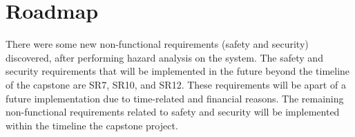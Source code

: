 \documentclass{article}
\begin{document}
\section{Roadmap}

There were some new non-functional requirements (safety and security) discovered, 
after performing hazard analysis on the system. The safety and security requirements 
that will be implemented in the future beyond the timeline of the capstone are SR7, 
SR10, and SR12. These requirements will be apart of a future implementation due to 
time-related and financial reasons. The remaining non-functional requirements related 
to safety and security will be implemented within the timeline the capstone project.
\end{document}
